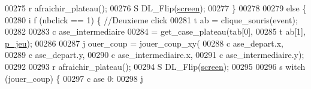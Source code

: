 \begin{DoxyCode}
00275                                                                                 r
      afraichir\_plateau();
00276                                                                                 S
      DL\_Flip(\hyperlink{fonction_interface_8h_a78fa3957d73de49cb81d047857504218}{screen});
00277                                                                         \}
00278 
00279                                                                         \textcolor{keywordflow}{else} \{
00280                                                                                 \textcolor{keywordflow}{i
      f} (nbclick == 1) \{ \textcolor{comment}{//Deuxieme click}
00281                                                                                         t
      ab = clique\_souris(event);
00282 
00283                                                                                         c
      ase\_intermediaire
00284                                                                                                         =
       get\_case\_plateau(tab[0],
00285                                                                                                                         t
      ab[1], \hyperlink{moteur_8h_a3efa8d0f7c65daedc584dc8db048e62c}{p_jeu});
00286 
00287                                                                                         j
      ouer\_coup = jouer\_coup\_xy(
00288                                                                                                         c
      ase\_depart.x,
00289                                                                                                         c
      ase\_depart.y,
00290                                                                                                         c
      ase\_intermediaire.x,
00291                                                                                                         c
      ase\_intermediaire.y);
00292 
00293                                                                                         r
      afraichir\_plateau();
00294                                                                                         S
      DL\_Flip(\hyperlink{fonction_interface_8h_a78fa3957d73de49cb81d047857504218}{screen});
00295 
00296                                                                                         \textcolor{keywordflow}{s
      witch} (jouer\_coup) \{
00297                                                                                         \textcolor{keywordflow}{c
      ase} 0:
00298                                                                                                 j

\end{DoxyCode}
